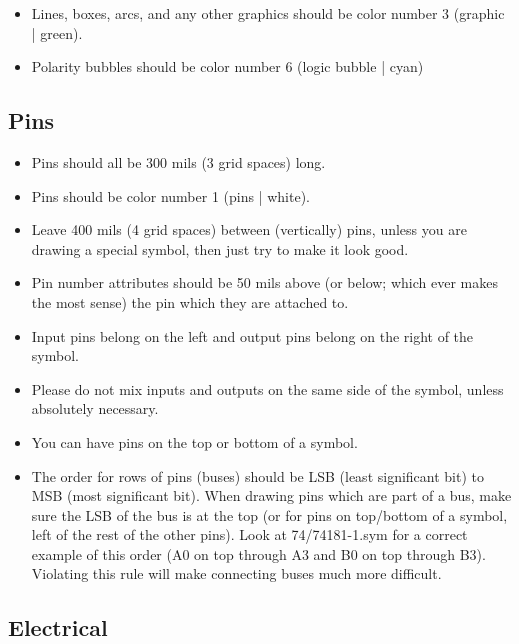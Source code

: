 \documentclass{article}
\begin{document}
\begin{itemize}
\item Lines, boxes, arcs, and any other graphics should be color number 3 
      (graphic | green).
\item Polarity bubbles should be color number 6 (logic bubble | cyan) 
\end{itemize}

\subsection{Pins}

\begin{itemize}
\item Pins should all be 300 mils (3 grid spaces) long.
\item Pins should be color number 1 (pins | white).
\item Leave 400 mils (4 grid spaces) between (vertically) pins, unless
      you are drawing a special symbol, then just try to make it look
      good.
\item Pin number attributes should be 50 mils above (or below; which
      ever makes the most sense) the pin which they are attached to.
\item Input pins belong on the left and output pins belong on the right of 
      the symbol.
\item Please do not mix inputs and outputs on the same side of the symbol,
      unless absolutely necessary. 
\item You can have pins on the top or bottom of a symbol.
\item The order for rows of pins (buses) should be LSB (least significant
      bit) to MSB (most significant bit).  When drawing pins which
      are part of a bus, make sure the LSB of the bus is at the top
      (or for pins on top/bottom of a symbol, left of the rest of
      the other pins).  Look at 74/74181-1.sym for a correct example
      of this order (A0 on top through A3 and B0 on top through B3).
      Violating this rule will make connecting buses much more difficult.

\end{itemize}

\subsection{Electrical}
\end{document}
